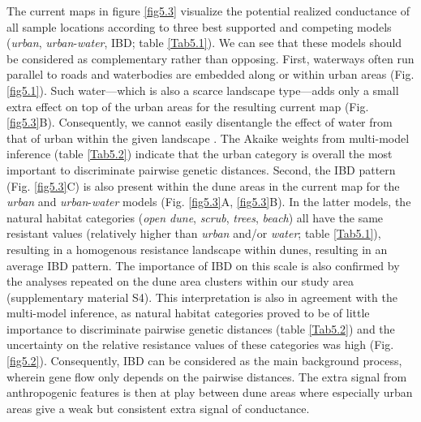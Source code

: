 \documentclass[10pt, twoside]{book} %
\begin{document}
	The current maps in figure \ref{fig5.3} visualize the potential realized conductance of all sample locations according to three best supported and competing models (\textit{urban}, \textit{urban}-\textit{water}, IBD; table \ref{Tab5.1}). We can see that these models should be considered as complementary rather than opposing. First, waterways often run parallel to roads and waterbodies are embedded along or within urban areas (Fig. \ref{fig5.1}). Such water---which is also a scarce landscape type---adds only a small extra effect on top of the urban areas for the resulting current map (Fig. \ref{fig5.3}B). Consequently, we cannot easily disentangle the effect of water from that of urban within the given landscape \citep{angelone2011, keller2012}. The Akaike weights from multi-model inference (table \ref{Tab5.2}) indicate that the urban category is overall the most important to discriminate pairwise genetic distances. Second, the IBD pattern (Fig. \ref{fig5.3}C) is also present within the dune areas in the current map for the \textit{urban} and \textit{urban}-\textit{water} models (Fig. \ref{fig5.3}A, \ref{fig5.3}B). In the latter models, the natural habitat categories (\textit{open dune}, \textit{scrub}, \textit{trees}, \textit{beach}) all have the same resistant values (relatively higher than \textit{urban} and/or \textit{water}; table \ref{Tab5.1}), resulting in a homogenous resistance landscape within dunes, resulting in an average IBD pattern. The importance of IBD on this scale is also confirmed by the analyses repeated on the dune area clusters within our study area (supplementary material S4). This interpretation is also in agreement with the multi-model inference, as natural habitat categories proved to be of little importance to discriminate pairwise genetic distances (table \ref{Tab5.2}) and the uncertainty on the relative resistance values of these categories was high (Fig. \ref{fig5.2}). Consequently, IBD can be considered as the main background process, wherein gene flow only depends on the pairwise distances. The extra signal from anthropogenic features is then at play between dune areas where especially urban areas give a weak but consistent extra signal of conductance.\\
	
\end{document}
